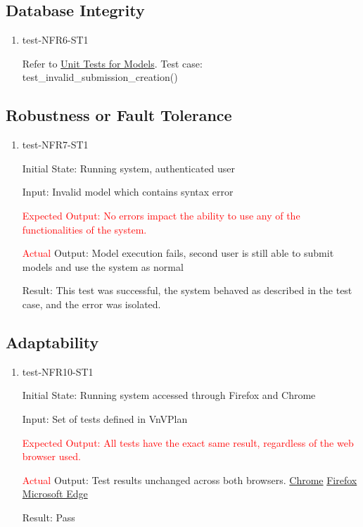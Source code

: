 \documentclass[12pt, titlepage]{article}
\begin{document}
\subsection{Database Integrity}
\begin{enumerate}
\item{test-NFR6-ST1} \label{test-NFR6-ST1}

Refer to \href{https://github.com/AidanMariglia/SOCAlgoTestPlatform/blob/main/src/webserver/webserver/submissions/tests.py}{Unit Tests for Models}. Test case: test\_invalid\_submission\_creation() 

\end{enumerate}
\subsection{Robustness or Fault Tolerance}
\begin{enumerate}
\item{test-NFR7-ST1} \label{test-NFR7-ST1}


Initial State: Running system, authenticated user

Input: Invalid model which contains syntax error

\textcolor{red}{Expected Output: No errors impact the ability to use any of the functionalities of the system.}

\textcolor{red}{Actual} Output: Model execution fails, second user is still able to submit models and use the system as normal

Result: This test was successful, the system behaved as described in the test case, and the error was isolated.

\end{enumerate}
\subsection{Adaptability}
\begin{enumerate}
\item{test-NFR10-ST1} \label{test-NFR10-ST1}

Initial State: Running system accessed through Firefox and Chrome

Input: Set of tests defined in VnVPlan

\textcolor{red}{Expected Output: All tests have the exact same result, regardless of the web browser used.}

\textcolor{red}{Actual} Output: Test results unchanged across both browsers. 
\href{https://github.com/AidanMariglia/SOCAlgoTestPlatform/blob/main/docs/VnVReport/images/chrome.png}{Chrome} \href{https://github.com/AidanMariglia/SOCAlgoTestPlatform/blob/main/docs/VnVReport/images/firefox.png}{Firefox} \href{https://github.com/AidanMariglia/SOCAlgoTestPlatform/blob/main/docs/VnVReport/images/microsoft_edge.png}{Microsoft Edge} 

Result: Pass
\end{enumerate}
\end{document}
